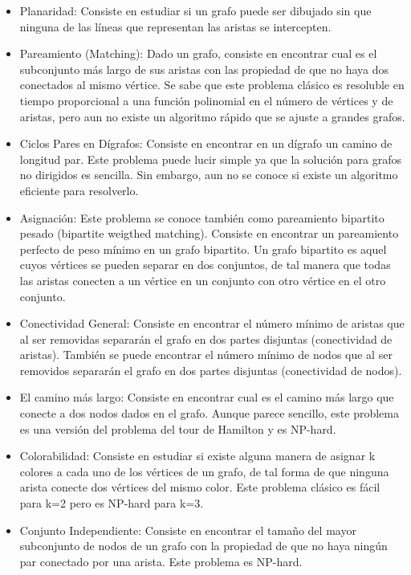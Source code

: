\begin{itemize}
	\item Planaridad: Consiste en estudiar si un grafo puede ser dibujado sin que ninguna de las líneas que representan las aristas se intercepten.
	
	\item Pareamiento (Matching): Dado un grafo, consiste en encontrar cual es el subconjunto más largo de sus aristas con las propiedad de que no haya dos conectados al mismo vértice. Se sabe que este problema clásico es resoluble en tiempo proporcional a una función polinomial en el número de vértices y de aristas, pero aun no existe un algoritmo rápido que se ajuste a grandes grafos.
	
	\item Ciclos Pares en Dígrafos: Consiste en encontrar en un dígrafo un camino de longitud par. Este problema puede lucir simple ya que la solución para grafos no dirigidos es sencilla. Sin embargo, aun no se conoce si existe un algoritmo eficiente para resolverlo.
	
	\item Asignación: Este problema se conoce también como pareamiento bipartito pesado (bipartite weigthed matching). Consiste en encontrar un pareamiento perfecto de peso mínimo en un grafo bipartito. Un grafo bipartito es aquel cuyos vértices se pueden separar en dos conjuntos, de tal manera que todas las aristas conecten a un vértice en un conjunto con otro vértice en el otro conjunto.
	
	\item Conectividad General: Consiste en encontrar el número mínimo de aristas que al ser removidas separarán el grafo en dos partes disjuntas (conectividad de aristas). También se puede encontrar el número mínimo de nodos que al ser removidos separarán el grafo en dos partes disjuntas (conectividad de nodos).
	
	\item El camino más largo: Consiste en encontrar cual es el camino más largo que conecte a dos nodos dados en el grafo. Aunque parece sencillo, este problema es una versión del problema del tour de Hamilton y es NP-hard.
	
	\item Colorabilidad: Consiste en estudiar si existe alguna manera de asignar k colores a cada uno de los vértices de un grafo, de tal forma de que ninguna arista conecte dos vértices del mismo color. Este problema clásico es fácil para k=2 pero es NP-hard para k=3.
	
	\item Conjunto Independiente: Consiste en encontrar el tamaño del mayor subconjunto de nodos de un grafo con la propiedad de que no haya ningún par conectado por una arista. Este problema es NP-hard.
	

\end{itemize}
